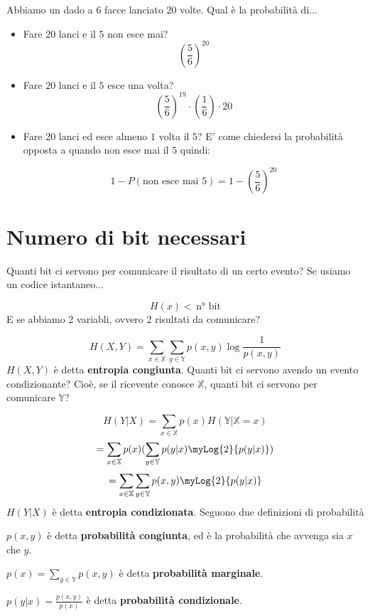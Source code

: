\documentclass[12pt]{report}
\begin{document}
    \begin{es}
        Abbiamo un dado a $6$ facce lanciato $20$ volte. Qual è la probabilità  di...

        \begin{itemize}
            \item Fare $20$ lanci e il $5$ non esce mai?
            $$(\frac{5}{6})^{20}$$
            \item Fare $20$ lanci e il $5$ esce una volta?
            $$(\frac{5}{6})^{19}\cdot(\frac{1}{6})\cdot20$$
            \item  Fare $20$ lanci ed esce almeno $1$ volta il $5$? E' come chiedersi la probabilità opposta a quando non esce mai il $5$ quindi:

            $$1 - P(\text{non esce mai 5}) = 1 - (\frac{5}{6})^{20}$$
        \end{itemize}
    \end{es}

    \section{Numero di bit necessari}
    Quanti bit ci servono per comunicare il risultato di un certo evento? Se usiamo un codice istantaneo...

    $$H(x) <\,\text{n° bit}$$
    E se abbiamo 2 variabli, ovvero 2 risultati da comunicare?

    $$H(X,Y) = \sum_{x \in \mathbb{X}} \sum_{y \in \mathbb{Y}} p(x,y) \log{\frac{1}{p(x,y)}}$$
    $H(X,Y)$ è detta \textbf{entropia congiunta}.
    Quanti bit ci servono avendo un evento condizionante? Cioè, se il ricevente conosce $\mathbb{X}$, quanti bit ci servono per comunicare $\mathbb{Y}$?

    $$H(Y|X) = \sum_{x \in \mathbb{X}} p(x) H(\mathbb{Y} | \mathbb{X} = x)$$
    $$= \sum_{x \in \mathbb{X}} p(x) (\sum_{y \in \mathbb{Y}} p(y|x) \myLog{2}{p(y|x)})$$
    $$= \sum_{x \in \mathbb{X}} \sum_{y \in \mathbb{Y}} p(x,y) \myLog{2}{p(y|x)} $$
    $H(Y|X)$ è detta \textbf{entropia condizionata}. Seguono due definizioni di probabilità

    \begin{defi}
        $p(x,y)$ è detta \textbf{probabilità congiunta}, ed è la probabilità che avvenga sia $x$ che $y$.
    \end{defi}
    \begin{defi}
        $p(x) = \sum_{y \in \mathbb{Y}} p(x,y)$ è detta \textbf{probabilità marginale}.
    \end{defi}
    \begin{defi}
        $p(y|x) = \frac{p(x,y)}{p(x)}$ è detta \textbf{probabilità condizionale}.
    \end{defi}
\end{document}
